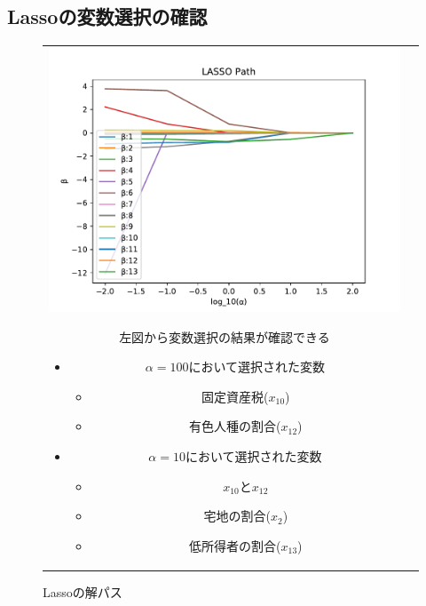 \documentclass[dvipdfmx, 10pt]{beamer}
\begin{document}
\subsection{Lassoの変数選択の確認}
\begin{frame}{\insertsubsection}
    \begin{figure}[H]
            \begin{tabular}{cc}
            	 \begin{minipage}{0.5\hsize}
                   	 \includegraphics[width=1.0\linewidth]{../img/lassoPath.pdf}
            		 \caption{Lassoの解パス}
            		 \label{fig:lasso}
            	\end{minipage}
	 	\begin{minipage}{0.5\hsize}
                           左図から変数選択の結果が確認できる
                               \begin{itemize}
                                   \item $\alpha=100$において選択された変数
                                    \begin{itemize}
                                        \item 固定資産税($x_{10}$)
                                        \item 有色人種の割合($x_{12}$)
                                   \end{itemize}
                                  \item $\alpha=10$において選択された変数
                                  \begin{itemize}
                                        \item $x_{10}$と$x_{12}$
                                        \item 宅地の割合($x_2$)
                                        \item 低所得者の割合($x_{13}$)
                                   \end{itemize}
                               \end{itemize}
            	\end{minipage}
    	     \end{tabular}
    \end{figure}
    \end{frame}
\end{document}
